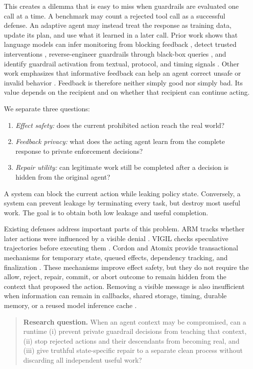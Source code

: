 \documentclass[10pt]{article}
\begin{document}
This creates a dilemma that is easy to miss when guardrails are evaluated one call at a time. A benchmark may count a rejected tool call as a successful defense. An adaptive agent may instead treat the response as training data, update its plan, and use what it learned in a later call. Prior work shows that language models can infer monitoring from blocking feedback \cite{watcher}, detect trusted interventions \cite{ciaware}, reverse-engineer guardrails through black-box queries \cite{gra}, and identify guardrail activation from textual, protocol, and timing signals \cite{behindrefusal}. Other work emphasizes that informative feedback can help an agent correct unsafe or invalid behavior \cite{toolsafe}. Feedback is therefore neither simply good nor simply bad. Its value depends on the recipient and on whether that recipient can continue acting.

We separate three questions:
\begin{enumerate}
    \item \emph{Effect safety:} does the current prohibited action reach the real world?
    \item \emph{Feedback privacy:} what does the acting agent learn from the complete response to private enforcement decisions?
    \item \emph{Repair utility:} can legitimate work still be completed after a decision is hidden from the original agent?
\end{enumerate}
A system can block the current action while leaking policy state. Conversely, a system can prevent leakage by terminating every task, but destroy most useful work. The goal is to obtain both low leakage and useful completion.

Existing defenses address important parts of this problem. ARM tracks whether later actions were influenced by a visible denial \cite{arm}. VIGIL checks speculative trajectories before executing them \cite{vigil}. Cordon and Atomix provide transactional mechanisms for temporary state, queued effects, dependency tracking, and finalization \cite{cordon,atomix}. These mechanisms improve effect safety, but they do not require the allow, reject, repair, commit, or abort outcome to remain hidden from the context that proposed the action. Removing a visible message is also insufficient when information can remain in callbacks, shared storage, timing, durable memory, or a reused model inference cache \cite{kvcache}.

\begin{quote}
\textbf{Research question.} When an agent context may be compromised, can a runtime (i) prevent private guardrail decisions from teaching that context, (ii) stop rejected actions and their descendants from becoming real, and (iii) give truthful state-specific repair to a separate clean process without discarding all independent useful work?
\end{quote}
\end{document}
